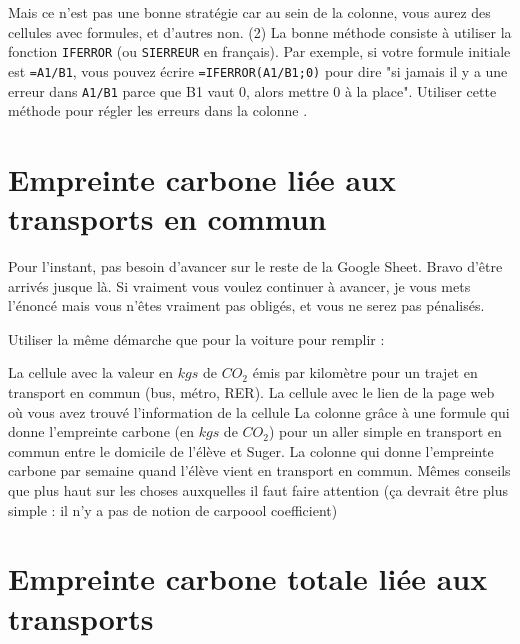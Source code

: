 \documentclass{exam}
\begin{document}
\begin{questions}
\begin{compactitem}
Mais ce n'est pas une bonne stratégie car au sein de la colonne, vous aurez des cellules avec formules, et d'autres non.
(2) La bonne méthode consiste à utiliser la fonction \verb|IFERROR| (ou \verb|SIERREUR| en français). Par exemple, si votre formule initiale est \verb|=A1/B1|, vous pouvez écrire \verb|=IFERROR(A1/B1;0)| pour dire "si jamais il y a une erreur dans \verb|A1/B1| parce que B1 vaut 0, alors mettre 0 à la place". Utiliser cette méthode pour régler les erreurs dans la colonne .
    \end{compactitem}
\end{questions}

\section{Empreinte carbone liée aux transports en commun}

\begin{Indication}
  Pour l'instant, pas besoin d'avancer sur le reste de la Google Sheet. Bravo d'être arrivés jusque là. Si vraiment vous voulez continuer à avancer, je vous mets l'énoncé mais vous n'êtes vraiment pas obligés, et vous ne serez pas pénalisés.
\end{Indication}

Utiliser la même démarche que pour la voiture pour remplir : 

\begin{questions}
  \question La cellule  avec la valeur en $kgs$ de $CO_2$ émis par kilomètre pour un trajet en transport en commun (bus, métro, RER).
\question La cellule  avec le lien de la page web où vous avez trouvé l'information de la cellule 
\question La colonne  grâce à une formule qui donne l'empreinte carbone (en $kgs$ de $CO_2$) pour un aller simple en transport en commun entre le domicile de l'élève et Suger.
    \question La colonne  qui donne l'empreinte carbone par semaine quand l'élève vient en transport en commun. Mêmes conseils que plus haut sur les choses auxquelles il faut faire attention (ça devrait être plus simple : il n'y a pas de notion de carpoool coefficient)
  \end{questions}

\section{Empreinte carbone totale liée aux transports}
\end{document}

